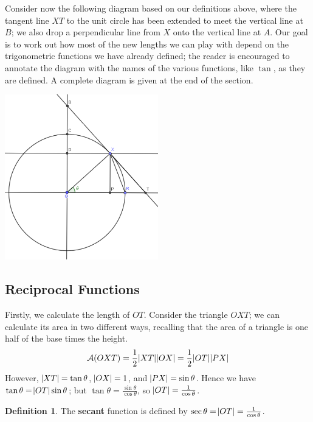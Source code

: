 \documentclass[a4paper,leqno]{article}
\numberwithin{equation}{section}
\theoremstyle{definition}
\newtheorem{defn}[equation]{Definition}
\theoremstyle{remark}
\newcommand{\df}[1]{\textbf{#1}}
\begin{document}
Consider now the following diagram based on our definitions above, where the tangent line $ XT $ to the unit circle has been
extended to meet the vertical line at $ B $; we also drop a perpendicular line from $ X $ onto the vertical line at $ A $.
Our goal is to work out how most of the new lengths we can play with depend on the trigonometric functions we have already
defined; the reader is encouraged to annotate the diagram with the names of the various functions, like $ \tan $, as they
are defined. A complete diagram is given at the end of the section.
\begin{center}
  \includegraphics[width=0.5\textwidth]{taxonomy}
\end{center}

\subsection{Reciprocal Functions}
Firstly, we calculate the length of $ OT $. Consider the triangle $ OXT $; we can calculate its area in two different ways,
recalling that the area of a triangle is one half of the base times the height.
\begin{displaymath}
  \mathcal{A}(OXT) = \frac{1}{2}\abs{XT}\abs{OX} = \frac{1}{2}\abs{OT}\abs{PX}
\end{displaymath}
However, $ \abs{XT} = \tan \theta $, $ \abs{OX} = 1 $, and $ \abs{PX} = \sin \theta $. Hence we
have $ \tan \theta = \abs{OT}\sin \theta $; but $ \tan \theta = \frac{\sin \theta}{\cos \theta} $,
so $ \abs{OT} = \frac{1}{\cos \theta} $.
\begin{defn}
  The \df{secant} function is defined by $ \sec \theta = \abs{OT} = \frac{1}{\cos \theta} $.
\end{defn}
\end{document}

